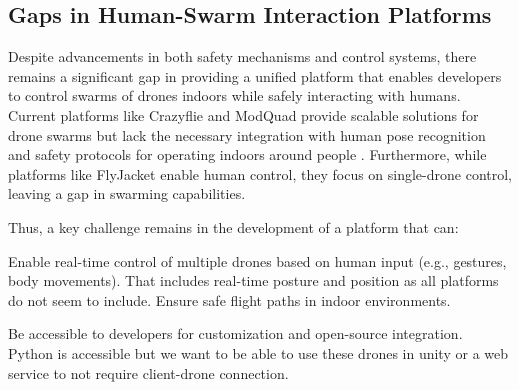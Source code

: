 \subsection{Gaps in Human-Swarm Interaction Platforms}
Despite advancements in both safety mechanisms and control systems, there remains a significant gap in providing a unified platform that enables developers to control swarms of drones indoors while safely interacting with humans. Current platforms like Crazyflie and ModQuad provide scalable solutions for drone swarms but lack the necessary integration with human pose recognition and safety protocols for operating indoors around people \cite{crazyflie, modquad}. Furthermore, while platforms like FlyJacket enable human control, they focus on single-drone control, leaving a gap in swarming capabilities. 

Thus, a key challenge remains in the development of a platform that can:

    Enable real-time control of multiple drones based on human input (e.g., gestures, body movements).
    That includes real-time posture and position as all platforms do not seem to include. \cite{cflib, crazyswarm, flyjacket}
    Ensure safe flight paths in indoor environments.

    Be accessible to developers for customization and open-source integration.
        Python is accessible but we want to be able to use these drones in unity or a web service to not require client-drone connection.
	
\pagebreak
